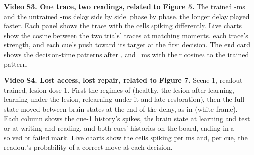 \begin{uncounted}
\smallskip
\noindent\textbf{Video S3. One trace, two readings, related to Figure 5.} The trained -ms and the untrained
-ms delay side by side, phase by phase, the longer delay played faster. Each panel shows the trace with the cells
spiking differently. Live charts show the cosine between the two trials' traces at matching moments, each trace's strength,
and each cue's push toward its target at the first decision. The end card shows the decision-time patterns after ,
 and ~ms with their cosines to the trained pattern.\par
\smallskip
\noindent\textbf{Video S4. Lost access, lost repair, related to Figure 7.} Scene 1, readout trained, lesion dose 1. First the
regimes of  (healthy, the lesion after learning, learning under the lesion, relearning under it and late
restoration), then the full state moved between brain states at the end of the delay, as in  (white frame). Each
column shows the cue-1 history's spikes, the brain state at learning and test or at writing and reading, and both cues'
histories on the board, ending in a solved or failed mark. Live charts show the cells spiking per ms and, per cue, the
readout's probability of a correct move at each decision.\par
\end{uncounted}
